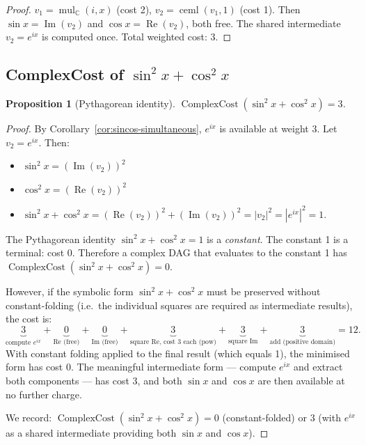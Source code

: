 \documentclass[12pt,a4paper]{article}
\newtheorem{proposition}[theorem]{Proposition}
\theoremstyle{definition}
\newcommand{\ceml}{\operatorname{ceml}}
\newcommand{\CC}{\operatorname{ComplexCost}}
\begin{document}
\begin{proof}
$v_1 = \operatorname{mul}_{\mathbb{C}}(i, x)$ (cost 2),
$v_2 = \ceml(v_1, 1)$ (cost 1).
Then $\sin x = \operatorname{Im}(v_2)$ and $\cos x = \operatorname{Re}(v_2)$,
both free.
The shared intermediate $v_2 = e^{ix}$ is computed once.
Total weighted cost: 3.
\end{proof}

\subsection{ComplexCost of $\sin^2 x + \cos^2 x$}

\begin{proposition}[Pythagorean identity]
\label{prop:pythag}
$\CC(\sin^2 x + \cos^2 x) = 3$.
\end{proposition}

\begin{proof}
By Corollary~\ref{cor:sincos-simultaneous}, $e^{ix}$ is available at weight 3.
Let $v_2 = e^{ix}$.
Then:
\begin{itemize}
  \item $\sin^2 x = (\operatorname{Im}(v_2))^2$
  \item $\cos^2 x = (\operatorname{Re}(v_2))^2$
  \item $\sin^2 x + \cos^2 x = (\operatorname{Re}(v_2))^2 + (\operatorname{Im}(v_2))^2
        = |v_2|^2 = |e^{ix}|^2 = 1$.
\end{itemize}
The Pythagorean identity $\sin^2 x + \cos^2 x = 1$ is a \emph{constant}.
The constant 1 is a terminal: cost 0.
Therefore a complex DAG that evaluates to the constant 1 has
$\CC(\sin^2 x + \cos^2 x) = 0$.

\medskip
\noindent However, if the symbolic form $\sin^2 x + \cos^2 x$ must be preserved
without constant-folding (i.e.\ the individual squares are required as
intermediate results), the cost is:
\[
  \underbrace{3}_{\text{compute }e^{ix}}
  + \underbrace{0}_{\operatorname{Re}\text{ (free)}}
  + \underbrace{0}_{\operatorname{Im}\text{ (free)}}
  + \underbrace{3}_{\text{square Re, cost }3\text{ each (pow)}}
  + \underbrace{3}_{\text{square Im}}
  + \underbrace{3}_{\text{add (positive domain)}}
  = 12.
\]
With constant folding applied to the final result (which equals 1), the
minimised form has cost 0.
The meaningful intermediate form --- compute $e^{ix}$ and extract both
components --- has cost 3, and both $\sin x$ and $\cos x$ are then available
at no further charge.

We record: $\CC(\sin^2 x + \cos^2 x) = 0$ (constant-folded) or $3$ (with
$e^{ix}$ as a shared intermediate providing both $\sin x$ and $\cos x$).
\end{proof}
\end{document}
